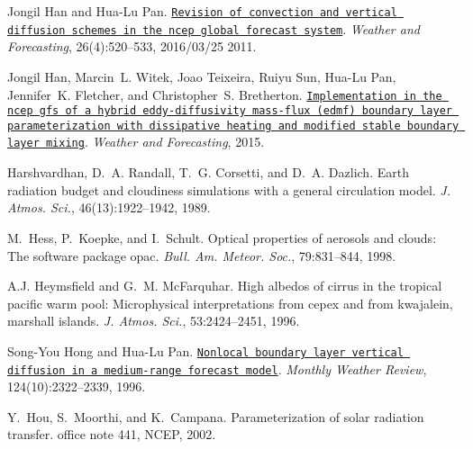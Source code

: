 \begin{DoxyDescription}
\item[\label{_CITEREF_han_and_pan_2011}%
\mbox{[}24\mbox{]}]Jongil Han and Hua-\/\+Lu Pan. \href{http://dx.doi.org/10.1175/WAF-D-10-05038.1}{\tt Revision of convection and vertical diffusion schemes in the ncep global forecast system}. {\itshape Weather and Forecasting}, 26(4)\+:520--533, 2016/03/25 2011. 


\item[\label{_CITEREF_han_et_al_2015}%
\mbox{[}25\mbox{]}]Jongil Han, Marcin~L. Witek, Joao Teixeira, Ruiyu Sun, Hua-\/\+Lu Pan, Jennifer~K. Fletcher, and Christopher~S. Bretherton. \href{http://dx.doi.org/10.1175/WAF-D-15-0053.1}{\tt Implementation in the ncep gfs of a hybrid eddy-\/diffusivity mass-\/flux (edmf) boundary layer parameterization with dissipative heating and modified stable boundary layer mixing}. {\itshape Weather and Forecasting}, 2015. 


\item[\label{_CITEREF_harshvardhan_et_al_1989}%
\mbox{[}26\mbox{]}]Harshvardhan, D.~A. Randall, T.~G. Corsetti, and D.~A. Dazlich. Earth radiation budget and cloudiness simulations with a general circulation model. {\itshape J. Atmos. Sci.}, 46(13)\+:1922--1942, 1989.


\item[\label{_CITEREF_hess_et_al_1998}%
\mbox{[}27\mbox{]}]M.~Hess, P.~Koepke, and I.~Schult. Optical properties of aerosols and clouds\+: The software package opac. {\itshape Bull. Am. Meteor. Soc.}, 79\+:831--844, 1998.


\item[\label{_CITEREF_heymsfield_and_mcfarquhar_1996}%
\mbox{[}28\mbox{]}]A.\+J. Heymsfield and G.~M. Mc\+Farquhar. High albedos of cirrus in the tropical pacific warm pool\+: Microphysical interpretations from cepex and from kwajalein, marshall islands. {\itshape J. Atmos. Sci.}, 53\+:2424--2451, 1996.


\item[\label{_CITEREF_hong_and_pan_1996}%
\mbox{[}29\mbox{]}]Song-\/\+You Hong and Hua-\/\+Lu Pan. \href{http://dx.doi.org/10.1175/1520-0493(1996)124<2322:NBLVDI>2.0.CO;2}{\tt Nonlocal boundary layer vertical diffusion in a medium-\/range forecast model}. {\itshape Monthly Weather Review}, 124(10)\+:2322--2339, 1996. 


\item[\label{_CITEREF_hou_et_al_2002}%
\mbox{[}30\mbox{]}]Y.~Hou, S.~Moorthi, and K.~Campana. Parameterization of solar radiation transfer. office note 441, N\+C\+EP, 2002.



\end{DoxyDescription}
